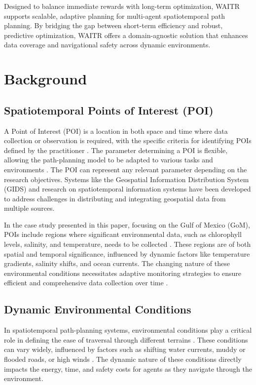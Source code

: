 \documentclass[conference]{IEEEtran}
\begin{document}
Designed to balance immediate rewards with long-term optimization, WAITR supports scalable, adaptive planning for multi-agent spatiotemporal path planning. By bridging the gap between short-term efficiency and robust, predictive optimization, WAITR offers a domain-agnostic solution that enhances data coverage and navigational safety across dynamic environments.



\section{Background}
\subsection{Spatiotemporal Points of Interest (POI)}
A Point of Interest (POI) is a location in both space and time where data collection or observation is required, with the specific criteria for identifying POIs defined by the practitioner \cite{rudnick2015ocean_research}. The parameter determining a POI is flexible, allowing the path-planning model to be adapted to various tasks and environments \cite{chassignet2007hycom}. The POI can represent any relevant parameter depending on the research objectives.  Systems like the Geospatial Information Distribution System (GIDS) \cite{chung2001gids} and research on spatiotemporal information systems \cite{ladner2012mining} have been developed to address challenges in distributing and integrating geospatial data from multiple sources.


In the case study presented in this paper, focusing on the Gulf of Mexico (GoM), POIs include regions where significant environmental data, such as chlorophyll levels, salinity, and temperature, needs to be collected \cite{chassignet2007hycom}. These regions are of both spatial and temporal significance, influenced by dynamic factors like temperature gradients, salinity shifts, and ocean currents. The changing nature of these environmental conditions necessitates adaptive monitoring strategies to ensure efficient and comprehensive data collection over time \cite{holmberg2022geo_spatiotemporal}.

\subsection{Dynamic Environmental Conditions}
In spatiotemporal path-planning systems, environmental conditions play a critical role in defining the ease of traversal through different terrains \cite{lavalle2006planning}. These conditions can vary widely, influenced by factors such as shifting water currents, muddy or flooded roads, or high winds \cite{thrun2005probabilistic}. The dynamic nature of these conditions directly impacts the energy, time, and safety costs for agents as they navigate through the environment.
\end{document}
